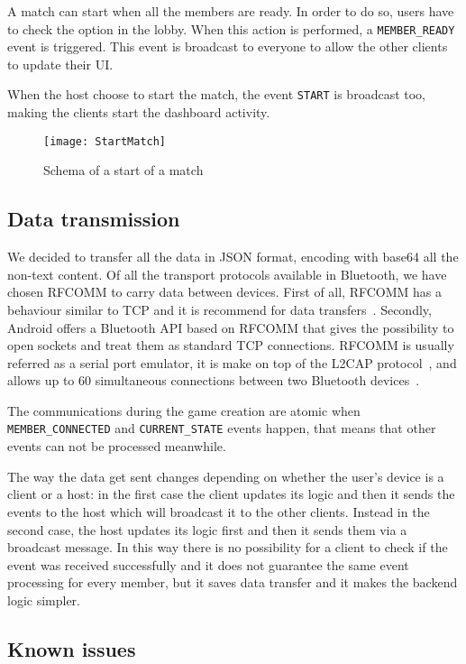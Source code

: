 A match can start when all the members are ready. In order to do so, users have 
to check the option in the lobby. When this action is performed, a 
\texttt{MEMBER\_READY} event is triggered. This event is broadcast to everyone 
to allow the other clients to update their UI.

When the host choose to start the match, the event \texttt{START} is 
broadcast too, making the clients start the dashboard activity.

\begin{figure}[t]
 \centering
 \texttt{[image: StartMatch]}
 \caption{Schema of a start of a match}
 \label{fig:gbStartMatch}
\end{figure}

\subsection{Data transmission}

We decided to transfer all the data in JSON format, encoding with base64 all the
non-text content.
Of all the transport protocols available in Bluetooth, we have chosen RFCOMM to 
carry data between devices. First of all, RFCOMM has a behaviour similar to TCP 
and it is recommend for data transfers~\cite{bisdikian01}. Secondly, Android 
offers a Bluetooth API based on RFCOMM that gives the possibility to open 
sockets and treat them as standard TCP connections.
RFCOMM is usually referred as a serial port emulator, it is make on top of 
the L2CAP protocol~\cite{bisdikian01}, and allows up to 60 simultaneous 
connections between two Bluetooth devices~\cite{aneesh12}.

The communications during the game creation are atomic when 
\texttt{MEMBER\_CONNECTED} and \texttt{CURRENT\_STATE} events happen, that 
means that other events can not be processed meanwhile.

The way the data get sent changes depending on whether the user's device is a 
client or a host: in the first case the client updates its logic and then it 
sends the events to the host which will broadcast it to the other clients. 
Instead in the second case, the host updates its logic first and then it sends 
them via a broadcast message. In this way there is no possibility for a client 
to check if the event was received successfully and it does not guarantee the 
same event processing for every member, but it saves data transfer and it makes 
the backend logic simpler.

\subsection{Known issues}

